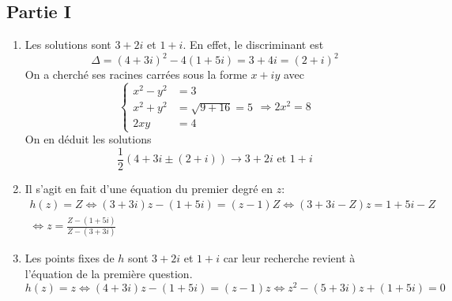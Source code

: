 \subsection*{Partie I}
\begin{enumerate}
  \item Les solutions sont $3+2i$ et $1+i$.\newline
En effet, le discriminant est
\begin{displaymath}
  \Delta = (4+3i)^2-4(1+5i) = 3 + 4i = (2 + i)^2
\end{displaymath}
On a cherché ses racines carrées sous la forme $x+iy$ avec
\begin{displaymath}
\left\lbrace 
\begin{aligned}
  x^2 - y^2 &= 3 \\ x^2 + y^2 &= \sqrt{9+16} = 5 \\2xy &= 4  
\end{aligned}
\right. \Rightarrow 2x^2 = 8
\end{displaymath}
On en déduit les solutions
\begin{displaymath}
  \frac{1}{2}\left( 4+3i \pm (2+i)\right) \longrightarrow 3+2i \text{ et } 1+i
\end{displaymath}

  \item Il s'agit en fait d'une équation du premier degré en $z$:
\begin{multline*}
h(z) = Z \Leftrightarrow (3 + 3i)z-(1+5i) = (z-1)Z
\Leftrightarrow (3 + 3i-Z)z = 1 + 5i - Z \\
\Leftrightarrow z = \frac{Z -(1+5i)}{Z-(3 + 3i)}
\end{multline*}

\item Les points fixes de $h$ sont $3+2i$ et $1+i$ car leur recherche revient à l'équation de la première question.
\begin{displaymath}
h(z) = z \Leftrightarrow  (4+3i)z-(1+5i) = (z-1)z
\Leftrightarrow z^2  -(5+3i)z + (1+5i) = 0
\end{displaymath}
\end{enumerate}

